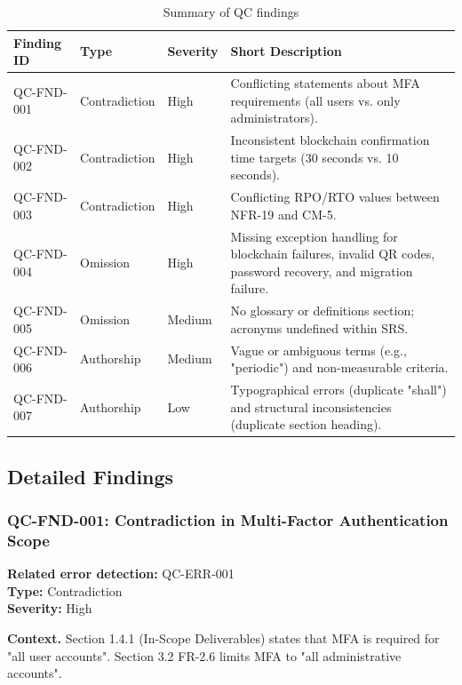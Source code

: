 \documentclass[11pt,a4paper]{article}
\begin{document}
\begin{table}[H]
\centering
\small
\renewcommand{\arraystretch}{1.4}
\begin{tabularx}{\textwidth}{|p{}|p{}|p{}|X|}
\hline
\rowcolor{tableheader}
\textbf{Finding ID} & \textbf{Type} & \textbf{Severity} & \textbf{Short Description} \\
\hline
QC-FND-001 & Contradiction & High & Conflicting statements about MFA requirements (all users vs. only administrators). \\
\hline
QC-FND-002 & Contradiction & High & Inconsistent blockchain confirmation time targets (30 seconds vs. 10 seconds). \\
\hline
QC-FND-003 & Contradiction & High & Conflicting RPO/RTO values between NFR-19 and CM-5. \\
\hline
QC-FND-004 & Omission & High & Missing exception handling for blockchain failures, invalid QR codes, password recovery, and migration failure. \\
\hline
QC-FND-005 & Omission & Medium & No glossary or definitions section; acronyms undefined within SRS. \\
\hline
QC-FND-006 & Authorship & Medium & Vague or ambiguous terms (e.g., "periodic") and non-measurable criteria. \\
\hline
QC-FND-007 & Authorship & Low & Typographical errors (duplicate "shall") and structural inconsistencies (duplicate section heading). \\
\hline
\end{tabularx}
\caption{Summary of QC findings}
\label{tab:qc-findings-summary}
\end{table}

\subsection{Detailed Findings}

\subsubsection*{QC-FND-001: Contradiction in Multi-Factor Authentication Scope}
\textbf{Related error detection:} QC-ERR-001 \\
\textbf{Type:} Contradiction \\
\textbf{Severity:} High

\textbf{Context.} Section 1.4.1 (In-Scope Deliverables) states that MFA is required for "all user accounts". Section 3.2 FR-2.6 limits MFA to "all administrative accounts".
\end{document}
